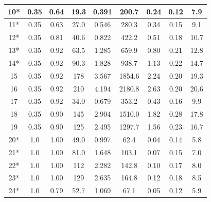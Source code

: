 \begin{table}[!ht]
\begin{tabular}{|c|c|c|c|c|c|c||c|c|}
10*       & 0.35     & 0.64       & 19.3        &  0.391                &  200.7         & 0.24          & 0.12       & 7.9      \\ \hline
11*       & 0.35     & 0.63       & 27.0        &  0.546                &  280.3         & 0.34          & 0.15       & 9.1      \\ \hline
12*       & 0.35     & 0.81       & 40.6        &  0.822                &  422.2         & 0.51          & 0.18       & 10.7      \\ \hline
13*       & 0.35     & 0.92       & 63.5        &  1.285                &  659.9         & 0.80          & 0.21       & 12.8       \\ \hline
14*       & 0.35     & 0.92       & 90.3        &  1.828                &  938.7         & 1.13          & 0.22       & 14.7       \\ \hline
15        & 0.35     & 0.92       & 178         &  3.567                &  1854.6        & 2.24          & 0.20       & 19.3       \\ \hline
16        & 0.35     & 0.92       & 210         &  4.194                &  2180.8        & 2.63          & 0.20       & 20.6       \\ \hline
17        & 0.35     & 0.92       & 34.0        &  0.679                &  353.2         & 0.43          & 0.16       & 9.9      \\ \hline
18        & 0.35     & 0.90       & 145         &  2.904                &  1510.0        & 1.82          & 0.28       & 17.8       \\ \hline
19        & 0.35     & 0.90       & 125         &  2.495                &  1297.7        & 1.56          & 0.23       & 16.7       \\ \hline
20*       & 1.0      & 1.00       & 49.0        &  0.997                &  62.4          & 0.04          & 0.14       & 5.8      \\ \hline
21*       & 1.0      & 1.00       & 81.0        &  1.648                &  103.1         & 0.07          & 0.15       & 7.0      \\ \hline
22*       & 1.0      & 1.00       & 112         &  2.282                &  142.8         & 0.10          & 0.17       & 8.0       \\ \hline
23*       & 1.0      & 1.00       & 129         &  2.635                &  164.8         & 0.12          & 0.18       & 8.5       \\ \hline
24*       & 1.0      & 0.79       & 52.7        &  1.069                &  67.1          & 0.05          & 0.12       & 5.9      \\ \hline

\end{tabular}
\end{table}
